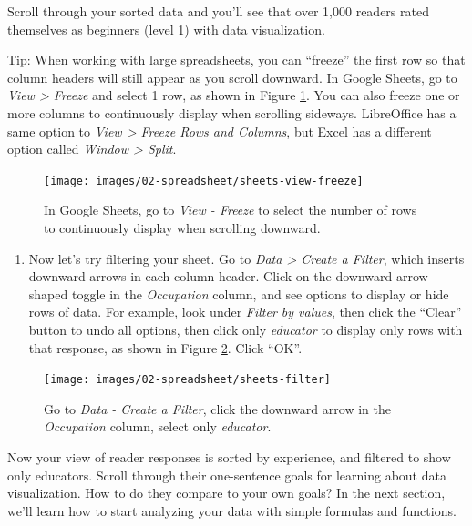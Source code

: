 \documentclass[
  english,
]{book}
\providecommand{\tightlist}{%
  \setlength{\itemsep}{0pt}\setlength{\parskip}{0pt}}
\begin{document}
Scroll through your sorted data and you'll see that over 1,000 readers rated themselves as beginners (level 1) with data visualization.

Tip: When working with large spreadsheets, you can ``freeze'' the first row so that column headers will still appear as you scroll downward. In Google Sheets, go to \emph{View \textgreater{} Freeze} and select 1 row, as shown in Figure \ref{fig:sheets-view-freeze}. You can also freeze one or more columns to continuously display when scrolling sideways. LibreOffice has a same option to \emph{View \textgreater{} Freeze Rows and Columns}, but Excel has a different option called \emph{Window \textgreater{} Split}.



\begin{figure}
\texttt{[image: images/02-spreadsheet/sheets-view-freeze]} \caption{In Google Sheets, go to \emph{View - Freeze} to select the number of rows to continuously display when scrolling downward.}\label{fig:sheets-view-freeze}
\end{figure}

\begin{enumerate}
\def\labelenumi{\arabic{enumi}.}
\setcounter{enumi}{4}
\tightlist
\item
  Now let's try filtering your sheet. Go to \emph{Data \textgreater{} Create a Filter}, which inserts downward arrows in each column header. Click on the downward arrow-shaped toggle in the \emph{Occupation} column, and see options to display or hide rows of data. For example, look under \emph{Filter by values}, then click the ``Clear'' button to undo all options, then click only \emph{educator} to display only rows with that response, as shown in Figure \ref{fig:sheets-filter}. Click ``OK''.
\end{enumerate}



\begin{figure}
\texttt{[image: images/02-spreadsheet/sheets-filter]} \caption{Go to \emph{Data - Create a Filter}, click the downward arrow in the \emph{Occupation} column, select only \emph{educator}.}\label{fig:sheets-filter}
\end{figure}

Now your view of reader responses is sorted by experience, and filtered to show only educators. Scroll through their one-sentence goals for learning about data visualization. How to do they compare to your own goals? In the next section, we'll learn how to start analyzing your data with simple formulas and functions.
\end{document}
